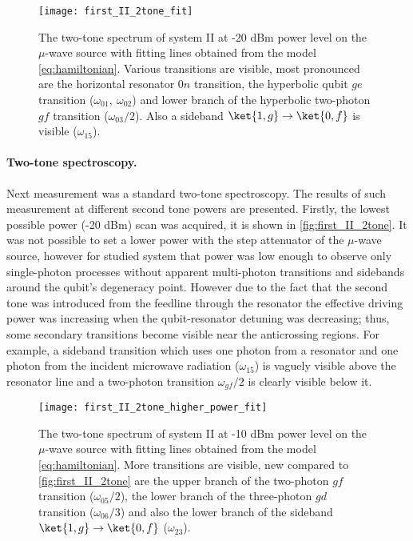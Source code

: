 \begin{figure}
\centering
\texttt{[image: first\_II\_2tone\_fit]}
\caption{The two-tone spectrum of system II at -20 dBm power level on the $\mu$-wave source with fitting lines obtained from the model \eqref{eq:hamiltonian}. Various transitions are visible, most pronounced are the horizontal resonator $0n$ transition, the hyperbolic qubit $ge$ transition ($\omega_{01},\ \omega_{02}$) and lower branch of the hyperbolic two-photon $gf$ transition ($\omega_{03}/2$). Also a sideband $\ket{1,g}\rightarrow \ket{0,f}$ is visible ($\omega_{15}$).}
\label{fig:first_II_2tone}
\end{figure}


\paragraph{Two-tone spectroscopy.} Next measurement was a standard two-tone spectroscopy. The results of such measurement at different second tone powers are presented. Firstly, the lowest possible power (-20 dBm) scan was acquired, it is shown in \autoref{fig:first_II_2tone}. It was not possible to set a lower power with the step attenuator of the $\mu$-wave source, however for studied system that power was low enough to observe only single-photon processes without apparent multi-photon transitions and sidebands around the qubit's degeneracy point. However due to the fact that the second tone was introduced from the feedline through the resonator the effective driving power was increasing when the qubit-resonator detuning was decreasing; thus, some secondary transitions become visible near the anticrossing regions. For example, a sideband transition which uses one photon from a resonator and one photon from the incident microwave radiation ($\omega_{15}$) is vaguely visible above the resonator line and a two-photon transition $\omega_{gf}/2$ is clearly visible below it.

\begin{figure}
\centering
\texttt{[image: first\_II\_2tone\_higher\_power\_fit]}
\caption{The two-tone spectrum of system II at -10 dBm power level on the $\mu$-wave source with fitting lines obtained from the model \eqref{eq:hamiltonian}. More transitions are visible, new compared to \autoref{fig:first_II_2tone} are the upper branch of the two-photon $gf$ transition ($\omega_{05}/2$), the lower branch of the three-photon $gd$ transition ($\omega_{06}/3$) and also the lower branch of the sideband $\ket{1,g}\rightarrow \ket{0,f}$ ($\omega_{23}$).}
\label{fig:first_II_2tone_hp}
\end{figure}

